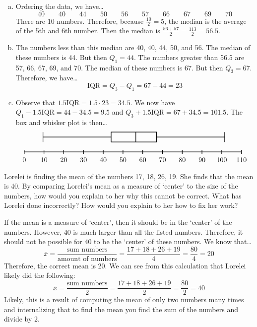 \documentclass[11pt,letterpaper]{article}
\begin{document}
\sol 
\begin{enumerate}[(a)]
\item Ordering the data, we have\dots
	\[
	40 \qquad 40 \qquad 44 \qquad 50 \qquad 56 \qquad 57 \qquad 66 \qquad 67 \qquad 69 \qquad 70
	\]
There are 10 numbers. Therefore, because $\frac{10}{2}= 5$, the median is the average of the 5th and 6th number. Then the median is $\frac{56 + 57}{2}= \frac{113}{2}= 56.5$. \pspace

\item The numbers less than this median are 40, 40, 44, 50, and 56. The median of these numbers is 44. But then $Q_1= 44$. The numbers greater than 56.5 are 57, 66, 67, 69, and 70. The median of these numbers is 67. But then $Q_3= 67$. Therefore, we have\dots
	\[
	\text{IQR}= Q_3 - Q_1= 67 - 44= 23
	\] \pspace

\item Observe that $1.5 \text{IQR}= 1.5 \cdot 23= 34.5$. We now have $Q_1 - 1.5 \text{IQR}= 44 - 34.5= 9.5$ and $Q_3 + 1.5\text{IQR}= 67 + 34.5= 101.5$. The box and whisker plot is then\dots
	\[
	\begin{tikzpicture}
	\draw[line width= 0.03cm] (0,0) -- (11,0);
	\foreach \x [evaluate=\x as \themark using \x/10] in {0,10,...,110} {
	\draw[line width=0.03cm] (\themark,-0.1) -- (\themark,0.1);
	\node at (\themark,-0.4) {\x};
	}
	\draw[line width=0.03cm] (4.4,0.5) -- (4.4,1) -- (6.7,1) -- (6.7,0.5) -- (4.4,0.5);
	\draw[line width=0.03cm] (5.65,0.5) -- (5.65,1);
	\draw[line width=0.03cm] (0.95,0.5) -- (0.95,1);
	\draw[line width=0.03cm] (0.95,0.75) -- (4.4,0.75);
	\draw[line width=0.03cm] (6.7,0.75) -- (10.15,0.75);
	\draw[line width=0.03cm] (10.15,0.5) -- (10.15,1);
	\end{tikzpicture}
	\]
\end{enumerate}



\newpage



 Lorelei is finding the mean of the numbers 17, 18, 26, 19. She finds that the mean is 40. By comparing Lorelei's mean as a measure of `center' to the size of the numbers, how would you explain to her why this cannot be correct. What has Lorelei done incorrectly? How would you explain to her how to fix her work? \pspace

\sol If the mean is a measure of `center', then it should be in the `center' of the numbers. However, 40 is much larger than all the listed numbers. Therefore, it should not be possible for 40 to be the `center' of these numbers. We know that\dots
	\[
	\overline{x}= \dfrac{\text{sum numbers}}{\text{amount of numbers}}= \dfrac{17 + 18 + 26 + 19}{4}= \dfrac{80}{4}= 20
	\]
Therefore, the correct mean is 20. We can see from this calculation that Lorelei likely did the following:
	\[
	\overline{x}= \dfrac{\text{sum numbers}}{2}= \dfrac{17 + 18 + 26 + 19}{2}= \dfrac{80}{2}= 40
	\]
Likely, this is a result of computing the mean of only two numbers many times and internalizing that to find the mean you find the sum of the numbers and divide by 2. 
\end{document}
